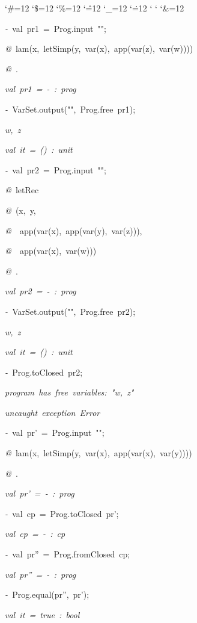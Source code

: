 \begin{list}{}
{\setlength{\leftmargin}{\leftmargini}
\setlength{\rightmargin}{0cm}
\setlength{\itemindent}{0cm}
\setlength{\listparindent}{0cm}
\setlength{\itemsep}{0cm}
\setlength{\parsep}{0cm}
\setlength{\labelsep}{0cm}
\setlength{\labelwidth}{0cm}
\catcode`\#=12
\catcode`\$=12
\catcode`\%=12
\catcode`\^=12
\catcode`\_=12
\catcode`\.=12
\catcode`
\catcode`
\catcode`\&=12
\ttfamily}
\small
\item[]\textsl{-\ }val\ pr1\ =\ Prog.input\ "";
\item[]\textsl{@\ }lam(x,\ letSimp(y,\ var(x),\ app(var(z),\ var(w))))
\item[]\textsl{@\ }.
\item[]\textsl{val\ pr1\ =\ -\ :\ prog}
\item[]\textsl{-\ }VarSet.output("",\ Prog.free\ pr1);
\item[]\textsl{w,\ z}
\item[]\textsl{val\ it\ =\ ()\ :\ unit}
\item[]\textsl{-\ }val\ pr2\ =\ Prog.input\ "";
\item[]\textsl{@\ }letRec
\item[]\textsl{@\ }(x,\ y,
\item[]\textsl{@\ }\ app(var(x),\ app(var(y),\ var(z))),
\item[]\textsl{@\ }\ app(var(x),\ var(w)))
\item[]\textsl{@\ }.
\item[]\textsl{val\ pr2\ =\ -\ :\ prog}
\item[]\textsl{-\ }VarSet.output("",\ Prog.free\ pr2);
\item[]\textsl{w,\ z}
\item[]\textsl{val\ it\ =\ ()\ :\ unit}
\item[]\textsl{-\ }Prog.toClosed\ pr2;
\item[]\textsl{program\ has\ free\ variables:\ "w,\ z"}
\item[]
\item[]\textsl{uncaught\ exception\ Error}
\item[]\textsl{-\ }val\ pr'\ =\ Prog.input\ "";
\item[]\textsl{@\ }lam(x,\ letSimp(y,\ var(x),\ app(var(x),\ var(y))))
\item[]\textsl{@\ }.
\item[]\textsl{val\ pr'\ =\ -\ :\ prog}
\item[]\textsl{-\ }val\ cp\ =\ Prog.toClosed\ pr';
\item[]\textsl{val\ cp\ =\ -\ :\ cp}
\item[]\textsl{-\ }val\ pr''\ =\ Prog.fromClosed\ cp;
\item[]\textsl{val\ pr''\ =\ -\ :\ prog}
\item[]\textsl{-\ }Prog.equal(pr'',\ pr');
\item[]\textsl{val\ it\ =\ true\ :\ bool}
\end{list}
